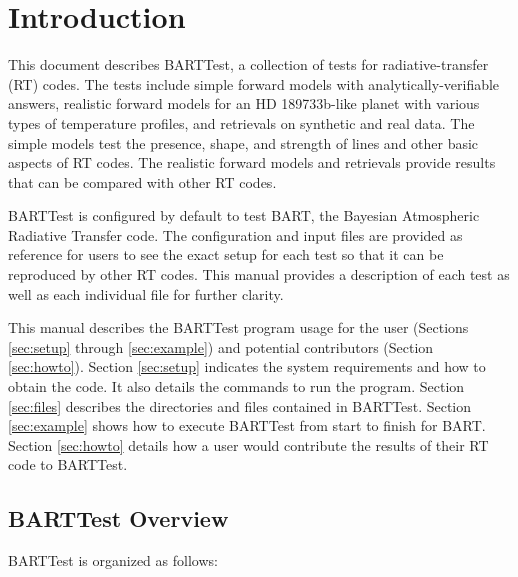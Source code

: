\documentclass[letterpaper, 12pt]{article}
\begin{document}
\section{Introduction}
\label{sec:intro}

This document describes BARTTest, a collection of tests for 
radiative-transfer (RT) codes. The tests include simple forward models with 
analytically-verifiable answers, realistic forward models for an 
HD 189733b-like planet with various types of temperature profiles, and 
retrievals on synthetic and real data. The simple models test the 
presence, shape, and strength of lines and other basic aspects of RT codes. 
The realistic forward models and retrievals provide results that can be 
compared with other RT codes.

BARTTest is configured by default to test BART, the Bayesian Atmospheric 
Radiative Transfer code. The configuration and input files are provided 
as reference for users to see the exact setup for each test so that it 
can be reproduced by other RT codes. This manual provides a description 
of each test as well as each individual file for further clarity.

This manual describes the BARTTest program usage for the user
(Sections \ref{sec:setup} through \ref{sec:example}) and
potential contributors (Section \ref{sec:howto}).  Section \ref{sec:setup} 
indicates the system requirements and how to obtain the code. 
It also details the commands to run the program.
Section \ref{sec:files} describes the directories and files contained in 
BARTTest.  Section \ref{sec:example} shows how to execute BARTTest from start 
to finish for BART.  Section \ref{sec:howto} details how a user would 
contribute the results of their RT code to BARTTest. 

\newpage

\subsection{BARTTest Overview}

\noindent BARTTest is organized as follows:

\vspace{0.7cm}
\end{document}

